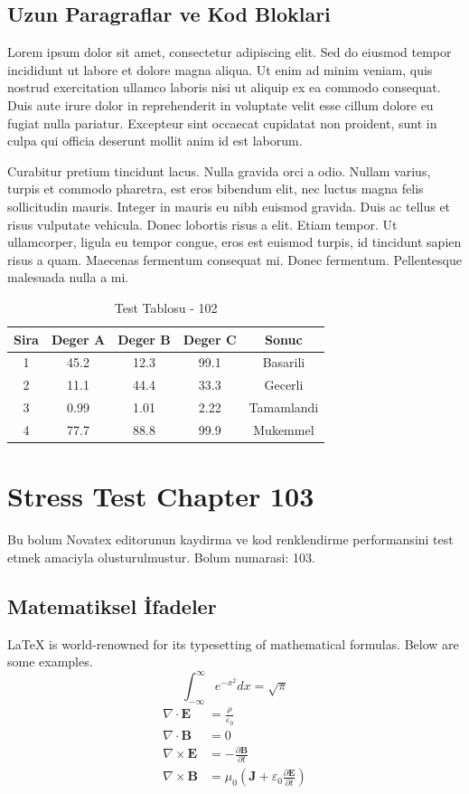 \documentclass[12pt,a4paper]{article}
\begin{document}
\subsection{Uzun Paragraflar ve Kod Bloklari}
Lorem ipsum dolor sit amet, consectetur adipiscing elit. Sed do eiusmod tempor incididunt ut labore et dolore magna aliqua. Ut enim ad minim veniam, quis nostrud exercitation ullamco laboris nisi ut aliquip ex ea commodo consequat. Duis aute irure dolor in reprehenderit in voluptate velit esse cillum dolore eu fugiat nulla pariatur. Excepteur sint occaecat cupidatat non proident, sunt in culpa qui officia deserunt mollit anim id est laborum.

Curabitur pretium tincidunt lacus. Nulla gravida orci a odio. Nullam varius, turpis et commodo pharetra, est eros bibendum elit, nec luctus magna felis sollicitudin mauris. Integer in mauris eu nibh euismod gravida. Duis ac tellus et risus vulputate vehicula. Donec lobortis risus a elit. Etiam tempor. Ut ullamcorper, ligula eu tempor congue, eros est euismod turpis, id tincidunt sapien risus a quam. Maecenas fermentum consequat mi. Donec fermentum. Pellentesque malesuada nulla a mi.

\begin{table}[h!]
\centering
\begin{tabular}{|c|c|c|c|c|}
\hline
\textbf{Sira} & \textbf{Deger A} & \textbf{Deger B} & \textbf{Deger C} & \textbf{Sonuc} \\
\hline
1 & 45.2 & 12.3 & 99.1 & Basarili \\
2 & 11.1 & 44.4 & 33.3 & Gecerli \\
3 & 0.99 & 1.01 & 2.22 & Tamamlandi \\
4 & 77.7 & 88.8 & 99.9 & Mukemmel \\
\hline
\end{tabular}
\caption{Test Tablosu - 102}
\end{table}

\newpage
\section{Stress Test Chapter 103}
Bu bolum Novatex editorunun kaydirma ve kod renklendirme performansini test etmek amaciyla olusturulmustur. Bolum numarasi: 103.

\subsection{Matematiksel İfadeler}
\LaTeX{} is world-renowned for its typesetting of mathematical formulas. Below are some examples.
\begin{equation}
\int_{-\infty}^{\infty} e^{-x^2} dx = \sqrt{\pi}
\end{equation}
\begin{align}
\nabla \cdot \mathbf{E} &= \frac{\rho}{\varepsilon_0} \\
\nabla \cdot \mathbf{B} &= 0 \\
\nabla \times \mathbf{E} &= -\frac{\partial \mathbf{B}}{\partial t} \\
\nabla \times \mathbf{B} &= \mu_0\left(\mathbf{J} + \varepsilon_0 \frac{\partial \mathbf{E}}{\partial t}\right)
\end{align}
\end{document}
